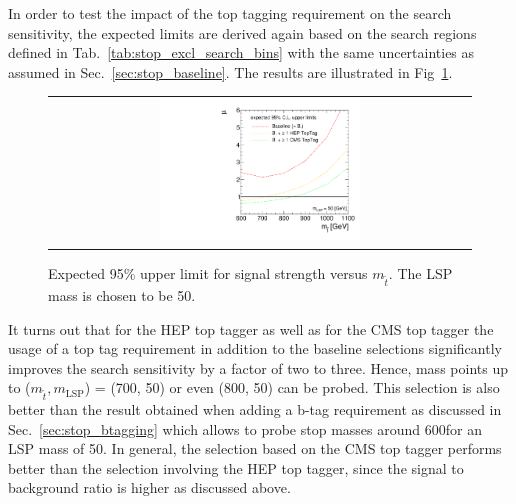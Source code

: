In order to test the impact of the top tagging requirement on the search sensitivity, the expected limits are derived again based on the search regions defined in Tab.~\ref{tab:stop_excl_search_bins} with the same uncertainties as assumed in Sec.~\ref{sec:stop_baseline}. The results are illustrated in Fig~\ref{fig:stop_baselinetoptag_limit}. \\
\begin{figure}[!h]
  \centering
  \begin{tabular}{c}
                \includegraphics[width=0.49\textwidth]{figures/limitplot4BinSel_BaselineTopTag.pdf} 
  \end{tabular}
  \caption{Expected 95\% upper limit for signal strength versus $m_{\tilde{t}}$. The LSP mass is chosen to be 50\gev.}
  \label{fig:stop_baselinetoptag_limit}
\end{figure}
It turns out that for the HEP top tagger as well as for the CMS top tagger the usage of a top tag requirement in addition to the baseline selections significantly improves the search sensitivity by a factor of two to three. Hence, mass points up to ($m_{\tilde{t}}, m_\mathrm{LSP}$) = (700, 50) or even (800, 50) can be probed. This selection is also better than the result obtained when adding a b-tag requirement as discussed in Sec.~\ref{sec:stop_btagging} which allows to probe stop masses around 600\gev for an LSP mass of 50\gev. In general, the selection based on the CMS top tagger performs better than the selection involving the HEP top tagger, since the signal to background ratio is higher as discussed above.

